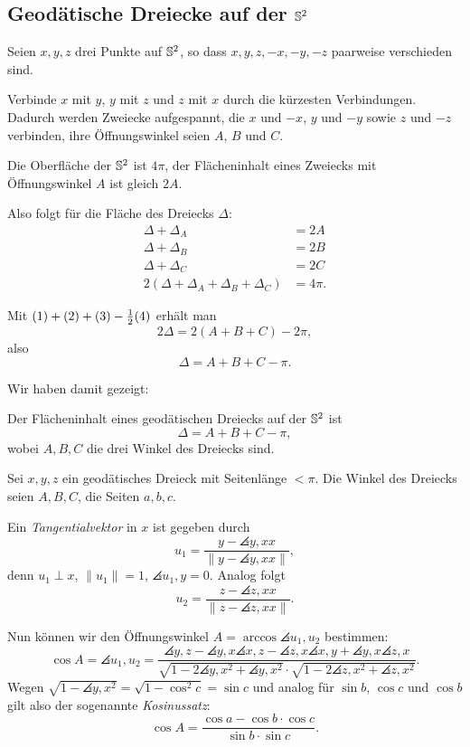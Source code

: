 \subsection{Geodätische Dreiecke auf der \texorpdfstring{$\mathbb{S}^2$}{S2}}

Seien $x,y,z$ drei Punkte auf $\mathbb{S}^2$, so dass $x,y,z,-x,-y,-z$ paarweise
verschieden sind.

Verbinde $x$ mit $y$, $y$ mit $z$ und $z$ mit $x$ durch die kürzesten
Verbindungen. Dadurch werden Zweiecke aufgespannt, die $x$ und $-x$, $y$ und
$-y$ sowie $z$ und $-z$ verbinden, ihre Öffnungswinkel seien $A$, $B$ und $C$.

Die Oberfläche der $\mathbb{S}^2$ ist $4 \pi$, der Flächeninhalt eines Zweiecks mit
Öffnungswinkel $A$ ist gleich $2A$.

Also folgt für die Fläche des Dreiecks $\Delta$:
\begin{align*}
    \Delta + \Delta_A &= 2A \tag{1} \\
    \Delta + \Delta_B &= 2B \tag{2} \\
    \Delta + \Delta_C &= 2C \tag{3} \\
    2(\Delta + \Delta_A + \Delta_B + \Delta_C) &= 4 \pi. \tag{4}
\end{align*}

Mit $(1) + (2) + (3) - \frac{1}{2} (4)$ erhält man
\[ 2 \Delta = 2 (A+B+C) - 2 \pi, \]
also
\[ \Delta = A + B + C - \pi. \]

Wir haben damit gezeigt:

\newpage

\begin{thm}
  Der Flächeninhalt eines geodätischen Dreiecks auf der $\mathbb{S}^2$ ist
  \[ \Delta = A + B + C - \pi, \]
  wobei $A,B,C$ die drei Winkel des Dreiecks sind.
\end{thm}

Sei $x,y,z$ ein geodätisches Dreieck mit Seitenlänge $< \pi$. Die Winkel des
Dreiecks seien $A,B,C$, die Seiten $a,b,c$.

Ein \emph{Tangentialvektor} in $x$ ist gegeben durch
\[ u_1 = \frac{y-\angles{y,x}x}{\|y-\angles{y,x}x\|}, \]
denn $u_1 \perp x$, $\| u_1 \| = 1$, $\angles{u_1,y} = 0$. Analog folgt
\[ u_2 = \frac{z-\angles{z,x}x}{\|z-\angles{z,x}x\|}. \]

Nun können wir den Öffnungswinkel $A = \arccos \angles{u_1, u_2}$ bestimmen:
\[ \cos A = \angles{u_1,u_2} =
  \frac{\angles{y,z} - \angles{y,x} \angles{x,z}
    - \angles{z,x} \angles{x,y} + \angles{y,x} \angles{z,x}}
  {\sqrt{1 - 2 \angles{y,x}^2 + \angles{y,x}^2} \cdot
    \sqrt{1 - 2 \angles{z,x}^2 + \angles{z,x}^2} }. \]
Wegen $\sqrt{1 - \angles{y,x}^2} = \sqrt{1 - \cos^2 c} = \sin c$ und analog für
$\sin b$, $\cos c$ und $\cos b$ gilt also der sogenannte \emph{Kosinussatz}:
\[ \cos A = \frac{ \cos a - \cos b \cdot \cos c }{ \sin b \cdot \sin c }. \]

